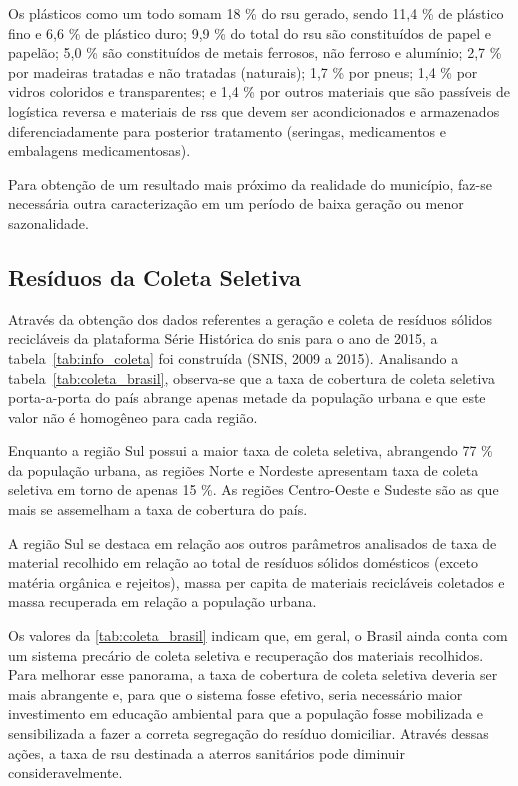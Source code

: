 Os plásticos como um todo somam 18 \% do \gls{rsu} gerado, sendo 11,4 \% de plástico fino e 6,6 \% de plástico duro; 9,9 \% do total do \gls{rsu} são constituídos de papel e papelão; 5,0 \% são constituídos de metais ferrosos, não ferroso e alumínio; 2,7 \% por madeiras tratadas e não tratadas (naturais); 1,7 \% por pneus; 1,4 \% por vidros coloridos e transparentes; e 1,4 \% por outros materiais que são passíveis de logística reversa e  materiais de \gls{rss} que devem ser acondicionados e armazenados diferenciadamente para posterior tratamento (seringas, medicamentos e embalagens medicamentosas).

Para obtenção de um resultado mais próximo da realidade do município, faz-se necessária outra caracterização em um período de baixa geração ou menor sazonalidade.

\subsection{Resíduos da Coleta Seletiva}
\label{subsec:res_coleta_seletiva}

Através da obtenção dos dados referentes a geração e coleta de resíduos sólidos recicláveis da plataforma Série Histórica do \gls{snis} para o ano de 2015, a tabela~\ref{tab:info_coleta} foi construída (SNIS, 2009 a 2015). Analisando a tabela~\ref{tab:coleta_brasil}, observa-se que a taxa de cobertura de coleta seletiva porta-a-porta do país abrange apenas metade da população urbana e que este valor não é homogêneo para cada região.

Enquanto a região Sul possui a maior taxa de coleta seletiva, abrangendo 77 \% da população urbana, as regiões Norte e Nordeste apresentam taxa de coleta seletiva em torno de apenas 15 \%. As regiões Centro-Oeste e Sudeste são as que mais se assemelham a taxa de cobertura do país.

A região Sul se destaca em relação aos outros parâmetros analisados de taxa de material recolhido em relação ao total de resíduos sólidos domésticos (exceto matéria orgânica e rejeitos), massa per capita de materiais recicláveis coletados e massa recuperada em relação a população urbana.



Os valores da \autoref{tab:coleta_brasil} indicam que, em geral, o Brasil ainda conta com um sistema precário de coleta seletiva e recuperação dos materiais recolhidos. Para melhorar esse panorama, a taxa de cobertura de coleta seletiva deveria ser mais abrangente e, para que o sistema fosse efetivo, seria necessário maior investimento em educação ambiental para que a população fosse mobilizada e sensibilizada a fazer a correta segregação do resíduo domiciliar. Através dessas ações, a taxa de \gls{rsu} destinada a aterros sanitários pode diminuir consideravelmente.

